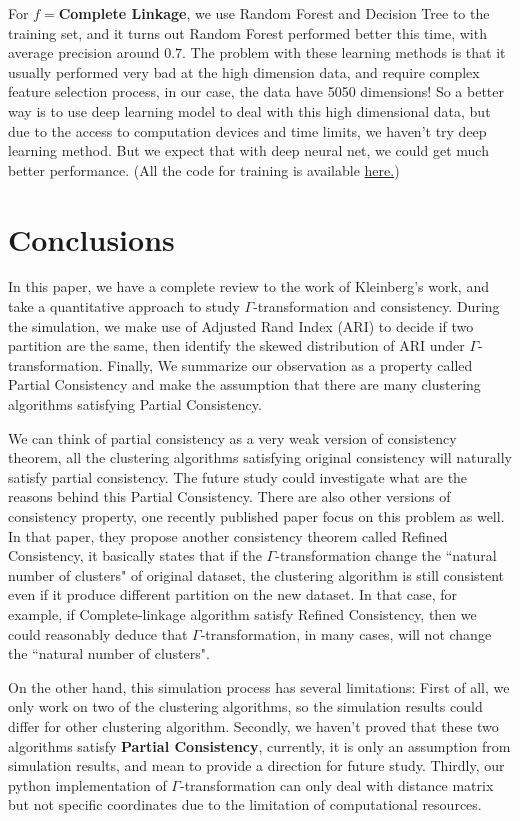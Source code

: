 \documentclass{uonmathreport}
\begin{document}
For $f=$\textbf{Complete Linkage}, we use Random Forest and Decision Tree to the training set, and it turns out Random Forest performed better this time, with average precision around $0.7$. The problem with these learning methods is that it usually performed very bad at the high dimension data, and require complex feature selection process, in our case, the data have 5050 dimensions! So a better way is to use deep learning model to deal with this high dimensional data, but due to the access to computation devices and time limits, we haven't try deep learning method. But we expect that with deep neural net, we could get much better performance. (All the code for training is available \href{https://github.com/Zehui127/clusteringResearch2019}{here.})




\section{Conclusions} \label{sec:conclusions}
In this paper, we have a complete review to the work of Kleinberg's work, and take a quantitative approach to study $\Gamma$-transformation and consistency. During the simulation, we make use of Adjusted Rand Index (ARI) to decide if two partition are the same, then identify the skewed distribution of ARI under $\Gamma$-transformation. Finally, We summarize  our observation as a property called Partial Consistency and make the assumption that there are many clustering algorithms satisfying Partial Consistency. 

We can think of partial consistency as a very weak version of consistency theorem, all the clustering algorithms satisfying original consistency will naturally satisfy partial consistency.  The future study could investigate what are the reasons behind this Partial Consistency. There are also other versions of consistency property, one recently published paper\cite{cohen2018clustering} focus on this problem as well. In that paper, they propose another consistency theorem called Refined Consistency, it basically states that if the $\Gamma$-transformation change the ``natural number of clusters" of original dataset, the clustering algorithm is still consistent even if it produce different  partition on the new dataset. In that case, for example, if Complete-linkage algorithm satisfy Refined Consistency, then we could reasonably deduce that $\Gamma$-transformation, in many cases, will not change the ``natural  number of clusters".


On the other hand, this simulation process has several limitations: First of all, we only work on two of the clustering algorithms, so the simulation results could differ for other clustering algorithm. Secondly, we haven't proved that these two algorithms satisfy \textbf{Partial Consistency}, currently, it is only an assumption from simulation results, and mean to provide a direction for future study. Thirdly, our python implementation of $\Gamma$-transformation can only deal with distance matrix but not specific coordinates due to the limitation of computational resources.
\newpage
\end{document}
